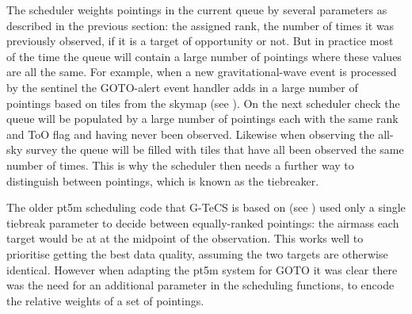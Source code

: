 \begin{colsection}

The scheduler weights pointings in the current queue by several parameters as described in the previous section: the assigned rank, the number of times it was previously observed, if it is a target of opportunity or not. But in practice most of the time the queue will contain a large number of pointings where these values are all the same. For example, when a new gravitational-wave event is processed by the sentinel the GOTO-alert event handler adds in a large number of pointings based on tiles from the skymap (see ). On the next scheduler check the queue will be populated by a large number of pointings each with the same rank and ToO flag and having never been observed. Likewise when observing the all-sky survey the queue will be filled with tiles that have all been observed the same number of times. This is why the scheduler then needs a further way to distinguish between pointings, which is known as the tiebreaker.

The older pt5m scheduling code that G-TeCS is based on (see ) used only a single tiebreak parameter to decide between equally-ranked pointings: the airmass each target would be at at the midpoint of the observation. This works well to prioritise getting the best data quality, assuming the two targets are otherwise identical. However when adapting the pt5m system for GOTO it was clear there was the need for an additional parameter in the scheduling functions, to encode the relative weights of a set of pointings.

\end{colsection}


